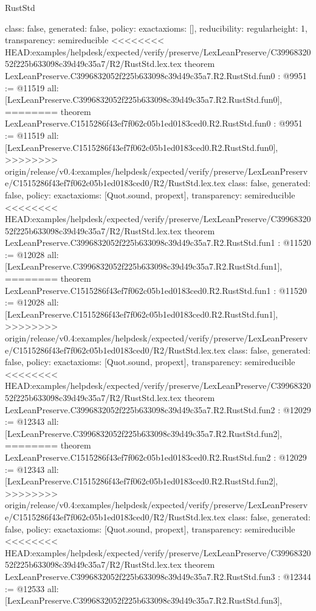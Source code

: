 \begin{lexlean}{RustStd}
\begin{coremodule}
{\begin{coremodule}
{{{  class: false,
  generated: false,
  policy: exact{axioms: []},
  reducibility: regular{height: 1},
  transparency: semireducible
}
<<<<<<<< HEAD:examples/helpdesk/expected/verify/preserve/LexLeanPreserve/C3996832052f225b633098c39d49c35a7/R2/RustStd.lex.tex
theorem LexLeanPreserve.C3996832052f225b633098c39d49c35a7.R2.RustStd.fun0 : @9951 := @11519 {
  all: [LexLeanPreserve.C3996832052f225b633098c39d49c35a7.R2.RustStd.fun0],
========
theorem LexLeanPreserve.C1515286f43ef7f062c05b1ed0183ced0.R2.RustStd.fun0 : @9951 := @11519 {
  all: [LexLeanPreserve.C1515286f43ef7f062c05b1ed0183ced0.R2.RustStd.fun0],
>>>>>>>> origin/release/v0.4:examples/helpdesk/expected/verify/preserve/LexLeanPreserve/C1515286f43ef7f062c05b1ed0183ced0/R2/RustStd.lex.tex
  class: false,
  generated: false,
  policy: exact{axioms: [Quot.sound, propext]},
  transparency: semireducible
}
<<<<<<<< HEAD:examples/helpdesk/expected/verify/preserve/LexLeanPreserve/C3996832052f225b633098c39d49c35a7/R2/RustStd.lex.tex
theorem LexLeanPreserve.C3996832052f225b633098c39d49c35a7.R2.RustStd.fun1 : @11520 := @12028 {
  all: [LexLeanPreserve.C3996832052f225b633098c39d49c35a7.R2.RustStd.fun1],
========
theorem LexLeanPreserve.C1515286f43ef7f062c05b1ed0183ced0.R2.RustStd.fun1 : @11520 := @12028 {
  all: [LexLeanPreserve.C1515286f43ef7f062c05b1ed0183ced0.R2.RustStd.fun1],
>>>>>>>> origin/release/v0.4:examples/helpdesk/expected/verify/preserve/LexLeanPreserve/C1515286f43ef7f062c05b1ed0183ced0/R2/RustStd.lex.tex
  class: false,
  generated: false,
  policy: exact{axioms: [Quot.sound, propext]},
  transparency: semireducible
}
<<<<<<<< HEAD:examples/helpdesk/expected/verify/preserve/LexLeanPreserve/C3996832052f225b633098c39d49c35a7/R2/RustStd.lex.tex
theorem LexLeanPreserve.C3996832052f225b633098c39d49c35a7.R2.RustStd.fun2 : @12029 := @12343 {
  all: [LexLeanPreserve.C3996832052f225b633098c39d49c35a7.R2.RustStd.fun2],
========
theorem LexLeanPreserve.C1515286f43ef7f062c05b1ed0183ced0.R2.RustStd.fun2 : @12029 := @12343 {
  all: [LexLeanPreserve.C1515286f43ef7f062c05b1ed0183ced0.R2.RustStd.fun2],
>>>>>>>> origin/release/v0.4:examples/helpdesk/expected/verify/preserve/LexLeanPreserve/C1515286f43ef7f062c05b1ed0183ced0/R2/RustStd.lex.tex
  class: false,
  generated: false,
  policy: exact{axioms: [Quot.sound, propext]},
  transparency: semireducible
}
<<<<<<<< HEAD:examples/helpdesk/expected/verify/preserve/LexLeanPreserve/C3996832052f225b633098c39d49c35a7/R2/RustStd.lex.tex
theorem LexLeanPreserve.C3996832052f225b633098c39d49c35a7.R2.RustStd.fun3 : @12344 := @12533 {
  all: [LexLeanPreserve.C3996832052f225b633098c39d49c35a7.R2.RustStd.fun3],
}}}}}}
\end{coremodule}}
\end{coremodule}
\end{lexlean}
